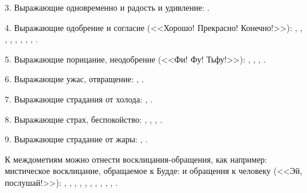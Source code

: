 3. Выражающие одновременно и радость и удивление: .

4. Выражающие одобрение и согласие (<<Хорошо! Прекрасно! Конечно!>>):
,
,
,
,
,
,
,
,
.

5. Выражающие порицание, неодобрение (<<Фи! Фу! Тьфу!>>):
,
,
,
.

6. Выражающие ужас, отвращение:
,
.

7. Выражающие страдания от холода:
,
.

8. Выражающие страх, беспокойство:
,
,
,
.

9. Выражающие страдание от жары:
,
.

К междометиям можно отнести восклицания-обращения, как например: мистическое восклицание, обращаемое к Будде:  и обращения к человеку (<<Эй, послушай!>>):
,
,
,
,
,
,
,
,
,
,
.
